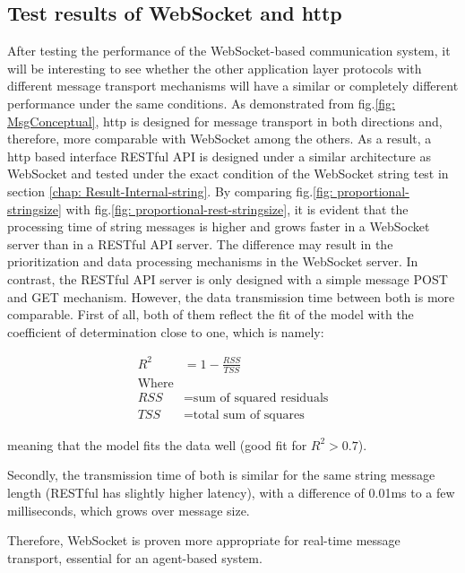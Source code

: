\subsection{Test results of WebSocket and \gls{http}} \label{chap: Result-RestFUL_WS}
After testing the performance of the WebSocket-based communication system, it will be 
interesting to see whether the other application layer protocols with different message 
transport mechanisms will have a similar or completely different performance under the 
same conditions. As demonstrated from fig.\ref{fig: MsgConceptual}, \gls{http} is designed 
for message transport in both directions and, therefore, more comparable with WebSocket 
among the others. As a result, a \gls{http} based interface RESTful API is designed under 
a similar architecture as WebSocket and tested under the exact condition of the WebSocket 
string test in section \ref{chap: Result-Internal-string}. By comparing 
fig.\ref{fig: proportional-stringsize} with fig.\ref{fig: proportional-rest-stringsize}, 
it is evident that the processing time of string messages is higher and grows faster in 
a WebSocket server than in a RESTful API server. The difference may result in the 
prioritization and data processing mechanisms in the WebSocket server. In contrast, 
the RESTful API server is only designed with a simple message POST and GET mechanism. 
However, the data transmission time between both is more comparable. First of all, 
both of them reflect the fit of the model with the coefficient of determination close 
to one, which is namely\cite{archdeacon1994correlation}: 


    \begin{align}
        R^{2} &= 1-\frac{RSS}{TSS}\\
        \text{Where} \nonumber\\
        RSS & = \text{sum of squared residuals} \nonumber\\
        TSS & = \text{total sum of squares}\nonumber
    \end{align}

meaning that the model fits the data well (good fit for $R^{2}>0.7$).





Secondly, the transmission time of both is similar 
for the same string message length (RESTful has slightly higher latency), with a difference 
of 0.01ms to a few milliseconds, which grows over message size. 



Therefore, WebSocket is proven more appropriate for real-time message transport, 
essential for an agent-based system.


